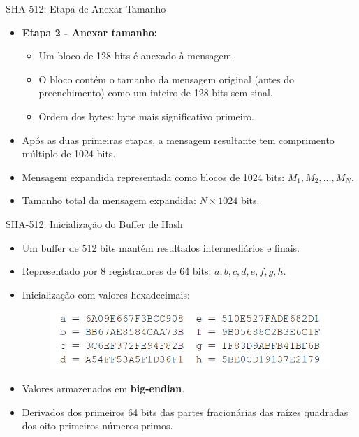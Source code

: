 \begin{frame}{SHA-512: Etapa de Anexar Tamanho}
    \begin{itemize}
        \item \textbf{Etapa 2 - Anexar tamanho:}
              \begin{itemize}
                  \item Um bloco de 128 bits é anexado à mensagem.
                  \item O bloco contém o tamanho da mensagem original (antes do preenchimento) como um inteiro de 128 bits sem sinal.
                  \item Ordem dos bytes: byte mais significativo primeiro.
              \end{itemize}
        \item Após as duas primeiras etapas, a mensagem resultante tem comprimento múltiplo de 1024 bits.
        \item Mensagem expandida representada como blocos de 1024 bits: $M_1, M_2, \dots, M_N$.
        \item Tamanho total da mensagem expandida: $N \times 1024$ bits.
    \end{itemize}
\end{frame}

\begin{frame}{SHA-512: Inicialização do Buffer de Hash}
    \begin{itemize}
        \item Um buffer de 512 bits mantém resultados intermediários e finais.
        \item Representado por 8 registradores de 64 bits: $a, b, c, d, e, f, g, h$.
        \item Inicialização com valores hexadecimais:
              \begin{figure}
                  \centering
                  \includegraphics[width=\linewidth]{Figuras/buffer-hash-sha256.png}

              \end{figure}
        \item Valores armazenados em \textbf{big-endian}.
        \item Derivados dos primeiros 64 bits das partes fracionárias das raízes quadradas dos oito primeiros números primos.
    \end{itemize}
\end{frame}
